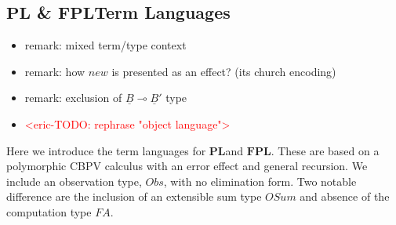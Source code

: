 \documentclass[acmsmall]{acmart}
\newcommand{\eric}[1]{\textcolor{red}{ <eric-#1> }}
\newcommand{\pl}{$\mathbf{PL}$}
\newcommand{\fpl}{$\mathbf{FPL}$}
\begin{document}
\subsection{\pl \; \& \fpl \;Term Languages}\label{sec:ObjLang}
\begin{itemize}
  \item remark: mixed term/type context
  \item remark: how $new$ is presented as an effect? (its church encoding)
  \item remark: exclusion of $\underline{B} \multimap \underline{B}' $ 
  type 

  \item \eric{TODO: rephrase "object language"}
\end{itemize}

Here we introduce the term languages for \pl \;and \fpl. These are based on a polymorphic CBPV calculus with an error effect and general recursion. We include an observation type, $Obs$, with no elimination form. Two notable difference are the inclusion of an extensible sum type $OSum$ and absence of the computation type $FA$.
\end{document}
